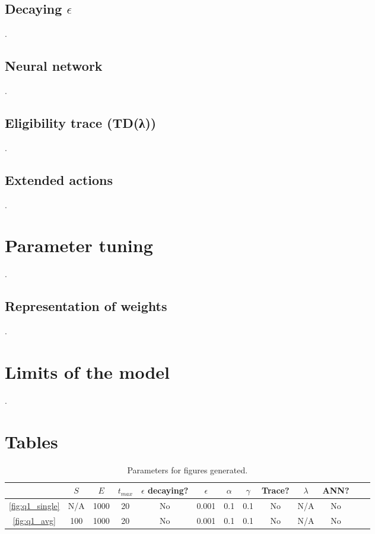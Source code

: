 \documentclass[a4paper, 11pt, twocolumn, draft]{article} %
\begin{document}
\subsection{Decaying $\epsilon$} .

\subsection{Neural network} \label{sec:ext_nn} .

\subsection{Eligibility trace (TD(λ))} .

\subsection{Extended actions} .

\section{Parameter tuning} .

\subsection{Representation of weights} .

\section{Limits of the model} .




\onecolumn \appendix

\section{Tables}
\begin{table}[H]
  \centering
  \begin{tabular}{c | c c c c c c c c c c c c}
    \hline
    & $S$ & $E$ & $t_{max}$ & $\epsilon$ decaying? & $\epsilon$ & $\alpha$ &
      $\gamma$ & Trace? & $\lambda$ & ANN? \\
    \hline
    \autoref{fig:q1_single} & N/A & 1000 & 20 & No & 0.001 & 0.1 & 0.1 & No &
      N/A & No \\
    \autoref{fig:q1_avg} & 100 & 1000 & 20 & No & 0.001 & 0.1 & 0.1 & No &
      N/A & No \\
    \hline
  \end{tabular}
  \caption{Parameters for figures generated.}
  \label{tab:parameters}
\end{table}
\end{document}
